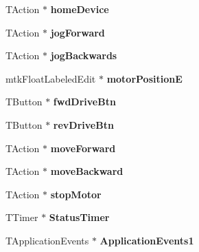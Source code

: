 \begin{DoxyCompactItemize}
\item 
T\+Action $\ast$ {\bfseries home\+Device}\hypertarget{class_t_main_a06760f0eefd55a6a8e74dc1289ea37fd}{}\label{class_t_main_a06760f0eefd55a6a8e74dc1289ea37fd}

\item 
T\+Action $\ast$ {\bfseries jog\+Forward}\hypertarget{class_t_main_a60f28665ee21e7821b934f1d0573cb6b}{}\label{class_t_main_a60f28665ee21e7821b934f1d0573cb6b}

\item 
T\+Action $\ast$ {\bfseries jog\+Backwards}\hypertarget{class_t_main_a12b9ba2eacf3e55eb9b3e83b58399453}{}\label{class_t_main_a12b9ba2eacf3e55eb9b3e83b58399453}

\item 
mtk\+Float\+Labeled\+Edit $\ast$ {\bfseries motor\+PositionE}\hypertarget{class_t_main_a8d672485d8c80d089472ecb66db8b102}{}\label{class_t_main_a8d672485d8c80d089472ecb66db8b102}

\item 
T\+Button $\ast$ {\bfseries fwd\+Drive\+Btn}\hypertarget{class_t_main_ab9c5ed3834151ab9357c367ecf5df1a3}{}\label{class_t_main_ab9c5ed3834151ab9357c367ecf5df1a3}

\item 
T\+Button $\ast$ {\bfseries rev\+Drive\+Btn}\hypertarget{class_t_main_a89e3ac6ad6c5ea219514e21e057025d2}{}\label{class_t_main_a89e3ac6ad6c5ea219514e21e057025d2}

\item 
T\+Action $\ast$ {\bfseries move\+Forward}\hypertarget{class_t_main_a8fa3551eb65fa54f260fcfcf60cd920c}{}\label{class_t_main_a8fa3551eb65fa54f260fcfcf60cd920c}

\item 
T\+Action $\ast$ {\bfseries move\+Backward}\hypertarget{class_t_main_aa7595235cba70e461a185e28b1533990}{}\label{class_t_main_aa7595235cba70e461a185e28b1533990}

\item 
T\+Action $\ast$ {\bfseries stop\+Motor}\hypertarget{class_t_main_a0729de930891203e38bc980b57280d08}{}\label{class_t_main_a0729de930891203e38bc980b57280d08}

\item 
T\+Timer $\ast$ {\bfseries Status\+Timer}\hypertarget{class_t_main_a99b04f524e1cb154c8b49078b6c90f67}{}\label{class_t_main_a99b04f524e1cb154c8b49078b6c90f67}

\item 
T\+Application\+Events $\ast$ {\bfseries Application\+Events1}\hypertarget{class_t_main_afb47a81901d7ce1e414f8be1ad41cb53}{}\label{class_t_main_afb47a81901d7ce1e414f8be1ad41cb53}


\end{DoxyCompactItemize}
